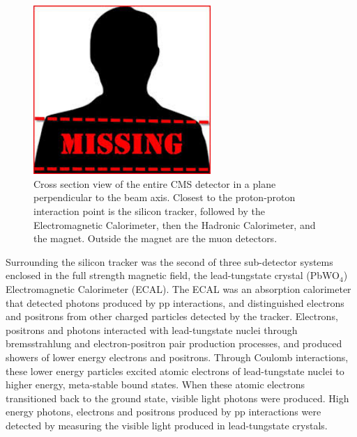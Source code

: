 \begin{figure}[h]
	\centering
	\includegraphics[width=0.6\textwidth]{figures/missingImage.png}
	\caption{Cross section view of the entire CMS detector in a plane perpendicular to the beam axis.  Closest to the
	proton-proton interaction point is the silicon tracker, followed by the Electromagnetic Calorimeter, then the Hadronic 
Calorimeter, and the magnet.  Outside the magnet are the muon detectors.}
	\label{fig:layersOfCMS}
\end{figure}


Surrounding the silicon tracker was the second of three sub-detector systems enclosed in the full strength magnetic field, the
lead-tungstate crystal (PbWO$_{4}$) Electromagnetic Calorimeter (ECAL).  The ECAL was an absorption calorimeter that
detected photons produced by pp interactions, and distinguished electrons and positrons from other charged 
particles detected by the tracker.  Electrons, positrons and photons interacted with lead-tungstate nuclei 
through bremsstrahlung and electron-positron pair production processes, and produced showers of lower energy
electrons and positrons.  Through Coulomb interactions, these lower energy particles excited atomic electrons
of lead-tungstate nuclei to higher energy, meta-stable bound states.  When these atomic electrons transitioned
back to the ground state, visible light photons were produced.  High energy photons, electrons and positrons 
produced by pp interactions were detected by measuring the visible light produced in lead-tungstate crystals.

